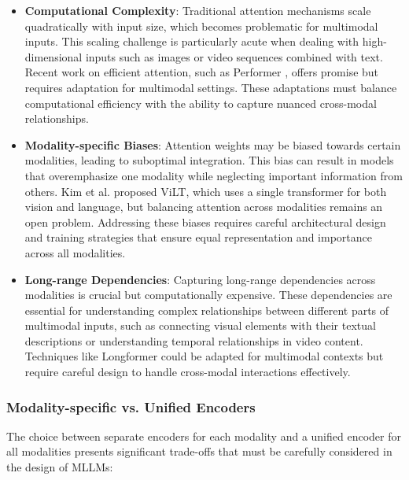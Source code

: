 \begin{itemize}
    \item \textbf{Computational Complexity}: Traditional attention mechanisms scale quadratically with input size, which becomes problematic for multimodal inputs. This scaling challenge is particularly acute when dealing with high-dimensional inputs such as images or video sequences combined with text. Recent work on efficient attention, such as Performer \cite{choromanski2021rethinking}, offers promise but requires adaptation for multimodal settings. These adaptations must balance computational efficiency with the ability to capture nuanced cross-modal relationships.

    
    \item \textbf{Modality-specific Biases}: Attention weights may be biased towards certain modalities, leading to suboptimal integration. This bias can result in models that overemphasize one modality while neglecting important information from others. Kim et al. \cite{kim2021vilt} proposed ViLT, which uses a single transformer for both vision and language, but balancing attention across modalities remains an open problem. Addressing these biases requires careful architectural design and training strategies that ensure equal representation and importance across all modalities.
    
    \item \textbf{Long-range Dependencies}: Capturing long-range dependencies across modalities is crucial but computationally expensive. These dependencies are essential for understanding complex relationships between different parts of multimodal inputs, such as connecting visual elements with their textual descriptions or understanding temporal relationships in video content. Techniques like Longformer \citep{beltagy2020longformer} could be adapted for multimodal contexts but require careful design to handle cross-modal interactions effectively.
\end{itemize}

\subsubsection{Modality-specific vs. Unified Encoders}
The choice between separate encoders for each modality and a unified encoder for all modalities presents significant trade-offs that must be carefully considered in the design of MLLMs:


